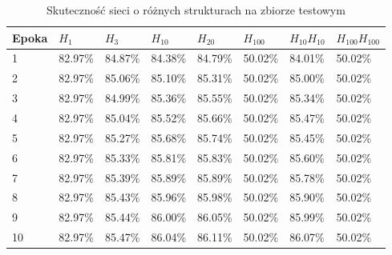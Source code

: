 \begin{table}[H]
\centering
\caption{Skuteczność sieci o różnych strukturach na zbiorze testowym}
\label{tab:hacc}
\begin{tabular}{|l|l|l|l|l|l|l|l|}
\hline
\textbf{Epoka} & \textbf{$H_{1}$} & \textbf{$H_{3}$} & \textbf{$H_{10}$} & \textbf{$H_{20}$} & \textbf{$H_{100}$} & \textbf{$H_{10}H_{10}$} & \textbf{$H_{100}H_{100}$} \\ \hline
1              & 82.97\%          & 84.87\%          & 84.38\%           & 84.79\%           & 50.02\%            & 84.01\%                 & 50.02\%                   \\ \hline
2              & 82.97\%          & 85.06\%          & 85.10\%           & 85.31\%           & 50.02\%            & 85.00\%                 & 50.02\%                   \\ \hline
3              & 82.97\%          & 84.99\%          & 85.36\%           & 85.55\%           & 50.02\%            & 85.34\%                 & 50.02\%                   \\ \hline
4              & 82.97\%          & 85.04\%          & 85.52\%           & 85.66\%           & 50.02\%            & 85.47\%                 & 50.02\%                   \\ \hline
5              & 82.97\%          & 85.27\%          & 85.68\%           & 85.74\%           & 50.02\%            & 85.45\%                 & 50.02\%                   \\ \hline
6              & 82.97\%          & 85.33\%          & 85.81\%           & 85.83\%           & 50.02\%            & 85.60\%                 & 50.02\%                   \\ \hline
7              & 82.97\%          & 85.39\%          & 85.89\%           & 85.89\%           & 50.02\%            & 85.78\%                 & 50.02\%                   \\ \hline
8              & 82.97\%          & 85.43\%          & 85.96\%           & 85.98\%           & 50.02\%            & 85.90\%                 & 50.02\%                   \\ \hline
9              & 82.97\%          & 85.44\%          & 86.00\%           & 86.05\%           & 50.02\%            & 85.99\%                 & 50.02\%                   \\ \hline
10             & 82.97\%          & 85.47\%          & 86.04\%           & 86.11\%           & 50.02\%            & 86.07\%                 & 50.02\%                   \\ \hline

\end{tabular}
\end{table}

